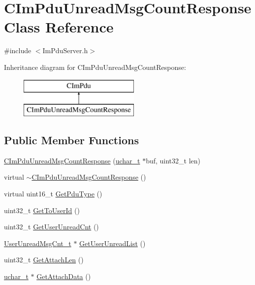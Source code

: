 \hypertarget{class_c_im_pdu_unread_msg_count_response}{}\section{C\+Im\+Pdu\+Unread\+Msg\+Count\+Response Class Reference}
\label{class_c_im_pdu_unread_msg_count_response}


{\ttfamily \#include $<$Im\+Pdu\+Server.\+h$>$}

Inheritance diagram for C\+Im\+Pdu\+Unread\+Msg\+Count\+Response\+:\begin{figure}[H]
\begin{center}
\leavevmode
\includegraphics[height=2.000000cm]{class_c_im_pdu_unread_msg_count_response}
\end{center}
\end{figure}
\subsection*{Public Member Functions}
\begin{DoxyCompactItemize}
\item 
\hyperlink{class_c_im_pdu_unread_msg_count_response_a9ce8053da15af00ea48740257c0e2ca3}{C\+Im\+Pdu\+Unread\+Msg\+Count\+Response} (\hyperlink{base_2ostype_8h_a124ea0f8f4a23a0a286b5582137f0b8d}{uchar\+\_\+t} $\ast$buf, uint32\+\_\+t len)
\item 
virtual \hyperlink{class_c_im_pdu_unread_msg_count_response_a3ec9b4ef0c0884227e891aa9afe3ce91}{$\sim$\+C\+Im\+Pdu\+Unread\+Msg\+Count\+Response} ()
\item 
virtual uint16\+\_\+t \hyperlink{class_c_im_pdu_unread_msg_count_response_a3ebdaf33bb074642b6bb5c8367332d29}{Get\+Pdu\+Type} ()
\item 
uint32\+\_\+t \hyperlink{class_c_im_pdu_unread_msg_count_response_a939d6644e805e66054bde75a90b73ca9}{Get\+To\+User\+Id} ()
\item 
uint32\+\_\+t \hyperlink{class_c_im_pdu_unread_msg_count_response_a626496116b1d9dbdc372f16169f801f5}{Get\+User\+Unread\+Cnt} ()
\item 
\hyperlink{struct_user_unread_msg_cnt__t}{User\+Unread\+Msg\+Cnt\+\_\+t} $\ast$ \hyperlink{class_c_im_pdu_unread_msg_count_response_a6e528b04465890a0b3abf710bd587bea}{Get\+User\+Unread\+List} ()
\item 
uint32\+\_\+t \hyperlink{class_c_im_pdu_unread_msg_count_response_a2cbbb82c91ef237f1df5c6c9f52eb20b}{Get\+Attach\+Len} ()
\item 
\hyperlink{base_2ostype_8h_a124ea0f8f4a23a0a286b5582137f0b8d}{uchar\+\_\+t} $\ast$ \hyperlink{class_c_im_pdu_unread_msg_count_response_a90b528726697d320d6bc3cb66bd6a16f}{Get\+Attach\+Data} ()
\end{DoxyCompactItemize}
